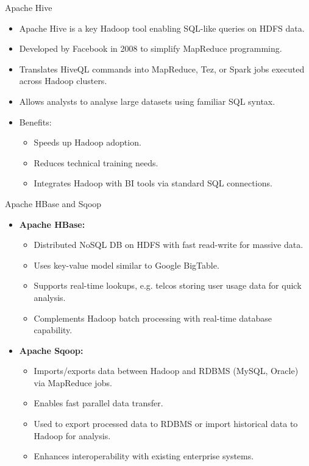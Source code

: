 \documentclass[aspectratio=169, table]{beamer}
\begin{document}
\begin{frame}{Apache Hive}
	\vspace{20pt}
	
	\begin{itemize}
		\item Apache Hive is a key Hadoop tool enabling SQL-like queries on HDFS data.
		\item Developed by Facebook in 2008 to simplify MapReduce programming.
		\item Translates HiveQL commands into MapReduce, Tez, or Spark jobs executed across Hadoop clusters.
		\item Allows analysts to analyse large datasets using familiar SQL syntax.
		\item Benefits:
		\begin{itemize}
			\item Speeds up Hadoop adoption.
			\item Reduces technical training needs.
			\item Integrates Hadoop with BI tools via standard SQL connections.
		\end{itemize}
	\end{itemize}
	
\end{frame}

\begin{frame}{Apache HBase and Sqoop}
	\vspace{20pt}
	
	\begin{itemize}
		\item \textbf{Apache HBase:}
		\begin{itemize}
			\item Distributed NoSQL DB on HDFS with fast read-write for massive data.
			\item Uses key-value model similar to Google BigTable.
			\item Supports real-time lookups, e.g. telcos storing user usage data for quick analysis.
			\item Complements Hadoop batch processing with real-time database capability.
		\end{itemize}
		\item \textbf{Apache Sqoop:}
		\begin{itemize}
			\item Imports/exports data between Hadoop and RDBMS (MySQL, Oracle) via MapReduce jobs.
			\item Enables fast parallel data transfer.
			\item Used to export processed data to RDBMS or import historical data to Hadoop for analysis.
			\item Enhances interoperability with existing enterprise systems.
		\end{itemize}
	\end{itemize}
	
\end{frame}
\end{document}
